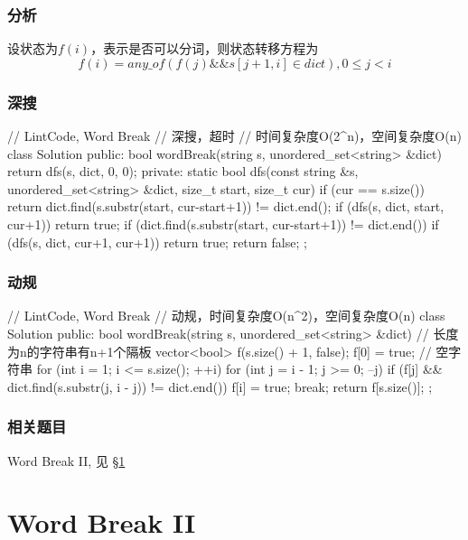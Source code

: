 \subsubsection{分析}
设状态为$f(i)$，表示是否可以分词，则状态转移方程为
$$
f(i) = any\_of(f(j) \&\& s[j+1,i] \in dict),  0 \leq j < i
$$


\subsubsection{深搜}
\begin{Code}
// LintCode, Word Break
// 深搜，超时
// 时间复杂度O(2^n)，空间复杂度O(n)
class Solution {
public:
    bool wordBreak(string s, unordered_set<string> &dict) {
        return dfs(s, dict, 0, 0);
    }
private:
    static bool dfs(const string &s, unordered_set<string> &dict,
            size_t start, size_t cur) {
        if (cur == s.size()) {
            return dict.find(s.substr(start, cur-start+1)) != dict.end();
        }
        if (dfs(s, dict, start, cur+1)) return true;
        if (dict.find(s.substr(start, cur-start+1)) != dict.end())
            if (dfs(s, dict, cur+1, cur+1)) return true;
        return false;
    }
};
\end{Code}


\subsubsection{动规}
\begin{Code}
// LintCode, Word Break
// 动规，时间复杂度O(n^2)，空间复杂度O(n)
class Solution {
public:
    bool wordBreak(string s, unordered_set<string> &dict) {
        // 长度为n的字符串有n+1个隔板
        vector<bool> f(s.size() + 1, false);
        f[0] = true; // 空字符串
        for (int i = 1; i <= s.size(); ++i) {
            for (int j = i - 1; j >= 0; --j) {
                if (f[j] && dict.find(s.substr(j, i - j)) != dict.end()) {
                    f[i] = true;
                    break;
                }
            }
        }
        return f[s.size()];
    }
};
\end{Code}


\subsubsection{相关题目}
\begindot
\item Word Break II, 见 \S \ref{sec:word-break-ii}
\myenddot


\section{Word Break II} %
\label{sec:word-break-ii}


